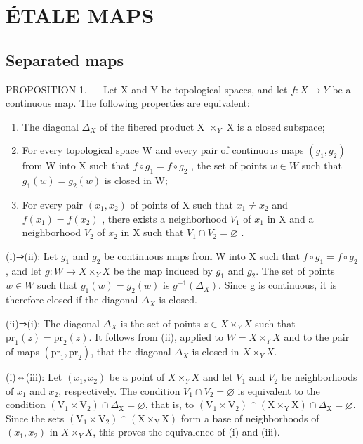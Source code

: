 \section{ÉTALE MAPS}

\subsection{Separated maps}

PROPOSITION 1. --- Let X and Y be topological spaces, and let \(f\colon X \to Y\) be a continuous map. The following properties are equivalent:

\begin{enumerate}
\def\labelenumi{(\roman{enumi})}
\item
  The diagonal \(\Delta_{X}\) of the fibered product X \(\times_{Y}\) X is a closed subspace;
\item
  For every topological space W and every pair of continuous maps \((g_{1}, g_{2})\) from W into X such that \(f \circ g_{1} = f \circ g_{2}\) , the set of points \(w \in W\) such that \(g_{1}(w) = g_{2}(w)\) is closed in W;
\item
  For every pair \((x_{1}, x_{2})\) of points of X such that \(x_{1} \neq x_{2}\) and \(f(x_{1}) = f(x_{2})\) , there exists a neighborhood \(V_{1}\) of \(x_{1}\) in X and a neighborhood \(V_{2}\) of \(x_{2}\) in X such that \(V_{1} \cap V_{2} = \varnothing\) .
\end{enumerate}

(i)⇒(ii): Let \(g_{1}\) and \(g_{2}\) be continuous maps from W into X such that \(f \circ g_{1} = f \circ g_{2}\), and let \(g: W \to X \times_{Y} X\) be the map induced by \(g_{1}\) and \(g_{2}\). The set of points \(w \in W\) such that \(g_{1}(w) = g_{2}(w)\) is \(g^{-1}(\Delta_{X})\). Since g is continuous, it is therefore closed if the diagonal \(\Delta_{X}\) is closed.

(ii)⇒(i): The diagonal \(\Delta_{X}\) is the set of points \(z \in X \times_{Y} X\) such that \(\mathrm{pr}_{1}(z) = \mathrm{pr}_{2}(z)\). It follows from (ii), applied to \(W = X \times_{Y} X\) and to the pair of maps \((\mathrm{pr}_{1}, \mathrm{pr}_{2})\), that the diagonal \(\Delta_{X}\) is closed in \(X \times_{Y} X\).

(i)⇔(iii): Let \((x_{1}, x_{2})\) be a point of \(X \times_{Y} X\) and let \(V_{1}\) and \(V_{2}\) be neighborhoods of \(x_{1}\) and \(x_{2}\), respectively. The condition \(V_{1} \cap V_{2} = \varnothing\) is equivalent to the condition \((\mathrm{V}_{1} \times \mathrm{V}_{2}) \cap \Delta_{\mathrm{X}} = \varnothing\), that is, to \((\mathrm{V}_{1} \times \mathrm{V}_{2}) \cap (\mathrm{X} \times_{\mathrm{Y}} \mathrm{X}) \cap \Delta_{\mathrm{X}} = \varnothing\). Since the sets \((\mathrm{V}_{1} \times \mathrm{V}_{2}) \cap (\mathrm{X} \times_{\mathrm{Y}} \mathrm{X})\) form a base of neighborhoods of \((x_{1}, x_{2})\) in \(X \times_{Y} X\), this proves the equivalence of (i) and (iii).

